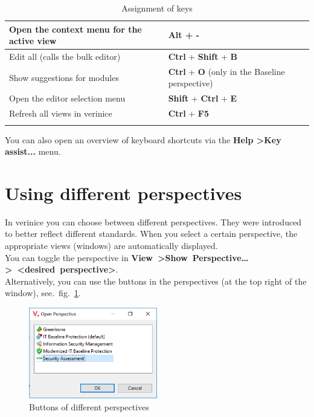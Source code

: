 \documentclass[a4paper,10pt]{book}
\begin{document}
\begin{longtable}{| p{} | p{} |}
Open the context menu for the active view & \textbf{Alt} + \textbf{-} \\[10pt] \hline
Edit all (calls the bulk editor) & \textbf{Ctrl} + \textbf{Shift} + \textbf{B} \\[10pt] \hline
Show suggestions for modules & \textbf{Ctrl} + \textbf{O} (only in the Baseline perspective)  \\[10pt] \hline
Open the editor selection menu & \textbf{Shift} + \textbf{Ctrl} + \textbf{E} \\[10pt] \hline
Refresh all views in verinice & \textbf{Ctrl} + \textbf{F5} \\[10pt] \hline
\caption{Assignment of keys}
\end{longtable}
You can also open an overview of keyboard shortcuts via the
\textbf{Help \textgreater Key assist...} menu.

\section{Using different perspectives} \label{Using different perspectives}
In verinice you can choose between different perspectives. They were introduced to better reflect
different standards. When you select a certain perspective, the appropriate views (windows) are
automatically displayed.
\newline \\
You can toggle the perspective in
\newline\mbox{\textbf{View \textgreater Show Perspective\ldots \textgreater
\textless desired perspective\textgreater}}.
\newline \\
Alternatively, you can use the buttons in the perspectives (at the top right of the window),
see.\ fig.~\ref{fig:window_persp}.

\begin{figure}[htb!]
  \centering
  \includegraphics[width=0.5\textwidth]{Screenshot/persp}
  \caption{Buttons of different perspectives}
  \label{fig:window_persp}
\end{figure}
\end{document}
